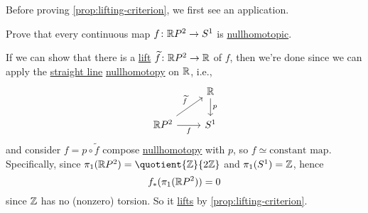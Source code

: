 Before proving \autoref{prop:lifting-criterion}, we first see an application.
\begin{eg}
	Prove that every continuous map \(f\colon \mathbb{\MakeUppercase{r}} P^{2}\to S^1\) is \hyperref[def:nullhomotopic]{nullhomotopic}.
\end{eg}
\begin{explanation}
	If we can show that there is a \hyperref[prop:homotopy-lifting-property]{lift} \(\widetilde{f} \colon \mathbb{\MakeUppercase{r}} P^{2}\to \mathbb{\MakeUppercase{r}}\) of \(f\),
	then we're done since we can apply the \hyperref[eg:lec1:straight-line-homotopy]{straight line} \hyperref[def:nullhomotopic]{nullhomotopy}
	on \(\mathbb{\MakeUppercase{r}} \), i.e.,
	\[
		\begin{tikzcd}
			& {\mathbb{R}} \\
			{\mathbb{R}P^2} & {S^1}
			\arrow["f"', from=2-1, to=2-2]
			\arrow["{\widetilde{f}}", from=2-1, to=1-2]
			\arrow["p", from=1-2, to=2-2]
		\end{tikzcd}
	\]
	and consider \(f = p \circ \widetilde{f} \) compose \hyperref[def:nullhomotopic]{nullhomotopy} with \(p\), so \(f\simeq \text{constant map} \).
	Specifically, since \(\pi _1(\mathbb{\MakeUppercase{r}} P^{2}) = \quotient{\mathbb{\MakeUppercase{z}}}{2 \mathbb{\MakeUppercase{z}}}\) and
	\(\pi _1(S^1) = \mathbb{\MakeUppercase{z}} \), hence
	\[
		f_\ast (\pi _1(\mathbb{\MakeUppercase{r}} P^{2} )) = 0
	\]
	since \(\mathbb{\MakeUppercase{z}} \) has no (nonzero) torsion. So it \hyperref[prop:homotopy-lifting-property]{lifts} by
	\autoref{prop:lifting-criterion}.
\end{explanation}


